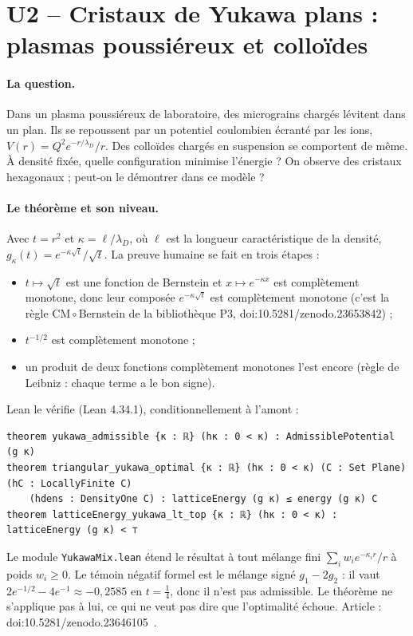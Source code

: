\section{U2 -- Cristaux de Yukawa plans : plasmas poussiéreux et colloïdes}\label{ch5:U2}

\paragraph{La question.} Dans un plasma poussiéreux de laboratoire, des micrograins chargés lévitent dans un plan.
Ils se repoussent par un potentiel coulombien écranté par les ions, $V(r)=Q^2e^{-r/\lambda_D}/r$. Des colloïdes
chargés en suspension se comportent de même. À densité fixée, quelle configuration minimise l'énergie ? On
observe des cristaux hexagonaux ; peut-on le démontrer dans ce modèle ?

\paragraph{Le théorème et son niveau.} Avec $t=r^2$ et $\kappa=\ell/\lambda_D$, où $\ell$ est la longueur
caractéristique de la densité, $g_\kappa(t)=e^{-\kappa\sqrt t}/\sqrt t$. La preuve humaine \tierC{} se fait en
trois étapes :
\begin{itemize}
\item $t\mapsto\sqrt t$ est une fonction de Bernstein et $x\mapsto e^{-\kappa x}$ est complètement monotone,
donc leur composée $e^{-\kappa\sqrt t}$ est complètement monotone (c'est la règle CM\,$\circ$\,Bernstein de la bibliothèque P3, doi:10.5281/zenodo.23653842) ;
\item $t^{-1/2}$ est complètement monotone ;
\item un produit de deux fonctions complètement monotones l'est encore (règle de Leibniz : chaque terme a le bon
signe).
\end{itemize}
Lean le vérifie \tierA{} (Lean 4.34.1), conditionnellement à l'amont :
\begin{leanbox}
\begin{lstlisting}[language=Lean]
theorem yukawa_admissible {κ : ℝ} (hκ : 0 < κ) : AdmissiblePotential (g κ)
theorem triangular_yukawa_optimal {κ : ℝ} (hκ : 0 < κ) (C : Set Plane) (hC : LocallyFinite C)
    (hdens : DensityOne C) : latticeEnergy (g κ) ≤ energy (g κ) C
theorem latticeEnergy_yukawa_lt_top {κ : ℝ} (hκ : 0 < κ) : latticeEnergy (g κ) < ⊤
\end{lstlisting}
\end{leanbox}
Le module \texttt{YukawaMix.lean} étend le résultat à tout mélange fini $\sum_iw_ie^{-\kappa_ir}/r$ à poids
$w_i\ge0$. Le témoin négatif formel est le mélange signé $g_1-2g_2$ : il vaut $2e^{-1/2}-4e^{-1}\approx-0{,}2585$
en $t=\tfrac14$, donc il n'est pas admissible. Le théorème ne s'applique pas à lui, ce qui ne veut pas dire que
l'optimalité échoue. Article : doi:10.5281/zenodo.23646105~\cite{ch2yuk}.

